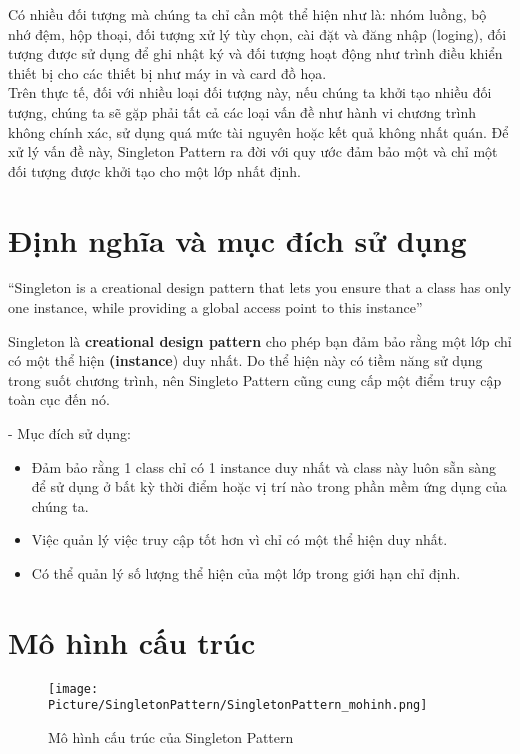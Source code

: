 
Có nhiều đối tượng mà chúng ta chỉ cần một thể hiện như là: nhóm luồng, bộ nhớ đệm, hộp thoại, đối tượng xử lý tùy chọn, cài đặt và đăng nhập (loging), đối tượng được sử dụng để ghi nhật ký và đối tượng hoạt động như trình điều khiển thiết bị cho các thiết bị như máy in và card đồ họa.\\

Trên thực tế, đối với nhiều loại đối tượng này, nếu chúng ta khởi tạo nhiều đối tượng, chúng ta sẽ gặp phải tất cả các loại vấn đề như hành vi chương trình không chính xác, sử dụng quá mức tài nguyên hoặc kết quả không nhất quán. Để xử lý vấn đề này, Singleton Pattern ra đời với quy ước đảm bảo một và chỉ một đối tượng được khởi tạo cho một lớp nhất định.

\section{Định nghĩa và mục đích sử dụng}

{\centering 
{\large
“Singleton is a creational design pattern that lets you ensure that a class has only one instance, while providing a global access point to this instance”}\par}

Singleton là \textbf{creational design pattern} cho phép bạn đảm bảo rằng một lớp chỉ có một thể hiện \textbf{(instance}) duy nhất. Do thể hiện này có tiềm năng sử dụng trong suốt chương trình, nên Singleto Pattern cũng cung cấp một điểm truy cập toàn cục đến nó.

- Mục đích sử dụng:
\begin{itemize}
\item Đảm bảo rằng 1 class chỉ có 1 instance duy nhất và class này luôn sẵn sàng để sử dụng ở bất kỳ thời điểm hoặc vị trí nào trong phần mềm ứng dụng của chúng ta.
\item Việc quản lý việc truy cập tốt hơn vì chỉ có một thể hiện duy nhất.
\item Có thể quản lý số lượng thể hiện của một lớp trong giới hạn chỉ định.
\end{itemize}

\section{Mô hình cấu trúc}

\begin{figure}[h]
\centerline{\texttt{[image: Picture/SingletonPattern/SingletonPattern\_mohinh.png]}}
\caption{Mô hình cấu trúc của Singleton Pattern}
\end{figure} 

